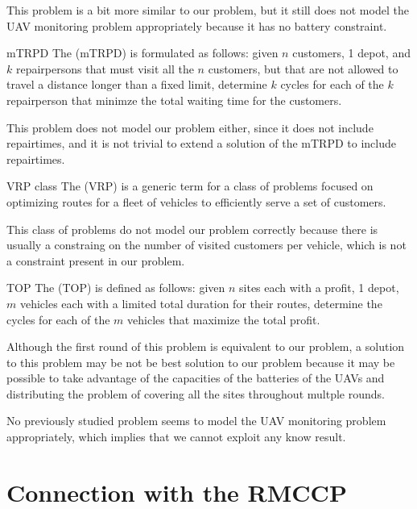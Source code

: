 \documentclass[a4paper, 12pt]{report}
\begin{document}
    This problem is a bit more similar to our problem, but it still does not model the UAV monitoring problem appropriately because it has no battery constraint.

    \begin{frameddefn}{mTRPD}
        The  (mTRPD) is formulated as follows: given $n$ customers, 1 depot, and $k$ repairpersons that must visit all the $n$ customers, but that are not allowed to travel a distance longer than a fixed limit, determine $k$ cycles for each of the $k$ repairperson that minimze the total waiting time for the customers.
    \end{frameddefn}

    This problem does not model our problem either, since it does not include repairtimes, and it is not trivial to extend a solution of the mTRPD to include repairtimes.

    \begin{frameddefn}{VRP class}
        The  (VRP) is a generic term for a class of problems focused on optimizing routes for a fleet of vehicles to efficiently serve a set of customers.
    \end{frameddefn}

    This class of problems do not model our problem correctly because there is usually a constraing on the number of visited customers per vehicle, which is not a constraint present in our problem.

    \begin{frameddefn}{TOP}
        The  (TOP) is defined as follows: given $n$ sites each with a profit, 1 depot, $m$ vehicles each with a limited total duration for their routes, determine the cycles for each of the $m$ vehicles that maximize the total profit.
    \end{frameddefn}

    Although the first round of this problem is equivalent to our problem, a solution to this problem may be not be best solution to our problem because it may be possible to take advantage of the capacities of the batteries of the UAVs and distributing the problem of covering all the sites throughout multple rounds.

    No previously studied problem seems to model the UAV monitoring problem appropriately, which implies that we cannot exploit any know result.

    \section{Connection with the RMCCP}
    
\end{document}
